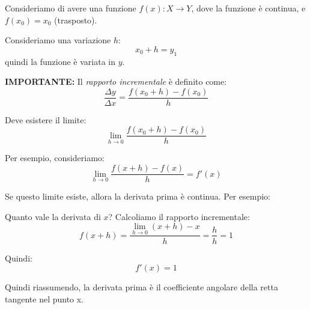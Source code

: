 \documentclass[12pt]{article}
\begin{document}
\Huge

Consideriamo di avere una funzione \( f(x): X \to Y \), dove la funzione è continua, e \( f(x_0) = x_0 \) (trasposto).

\vspace{0.5cm}

Consideriamo una variazione \( h \): 
\[
x_0 + h = y_1
\]
quindi la funzione è variata in \( y \).

\vspace{0.5cm}

\textbf{IMPORTANTE:} Il \textit{rapporto incrementale} è definito come: 
\[
\frac{\Delta y}{\Delta x} = \frac{f(x_0 + h) - f(x_0)}{h}
\]

Deve esistere il limite:
\[
\lim_{h \to 0} \frac{f(x_0 + h) - f(x_0)}{h}
\]

\vspace{0.5cm}

Per esempio, consideriamo:
\[
\lim_{h \to 0} \frac{f(x + h) - f(x)}{h} = f'(x)
\]

Se questo limite esiste, allora la derivata prima è continua. Per esempio:

\vspace{0.5cm}

Quanto vale la derivata di \( x \)? Calcoliamo il rapporto incrementale:
\[
f(x + h) = \frac{\lim_{h \to 0} (x + h) - x}{h} = \frac{h}{h} = 1
\]

Quindi:
\[
f'(x) = 1
\]

Quindi riassumendo, la derivata prima è il coefficiente angolare della retta tangente nel
punto x.
\end{document}
